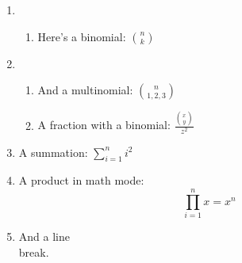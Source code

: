 \documentclass{article}
\begin{document}
\thispagestyle{fancy} %

\begin{enumerate}
	\item 
	\begin{enumerate}
		\item Here's a binomial: ${n \choose k}$
	
	\end{enumerate}

	\item 
	
	\begin{enumerate}
		
		\item And a multinomial: ${n \choose 1, 2, 3}$
		
		\item A fraction with a binomial: $\frac{{x \choose y}}{z^2}$
	
	\end{enumerate}
	
	\item A summation: $\sum\limits_{i=1}^n i^2$
	
	\item A product in math mode: \[\prod\limits_{i=1}^n x = x^n\]
	
	\item And a line \\ break.


\end{enumerate}

\newpage
\end{document}
